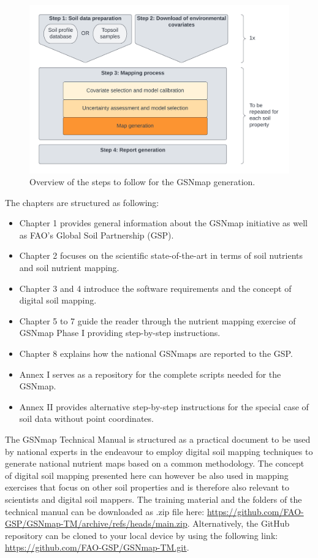 \documentclass[
  10pt,
  b5paper,
  oneside]{book}
\providecommand{\tightlist}{%
  \setlength{\itemsep}{0pt}\setlength{\parskip}{0pt}}
\begin{document}
\begin{figure}
\includegraphics[width=1\linewidth]{images/Manual-Workflow} \caption{Overview of the steps to follow for the GSNmap generation.}\label{fig:steps}
\end{figure}

The chapters are structured as following:

\begin{itemize}
\tightlist
\item
  Chapter 1 provides general information about the GSNmap initiative as well as FAO's Global Soil Partnership (GSP).
\item
  Chapter 2 focuses on the scientific state-of-the-art in terms of soil nutrients and soil nutrient mapping.
\item
  Chapter 3 and 4 introduce the software requirements and the concept of digital soil mapping.
\item
  Chapter 5 to 7 guide the reader through the nutrient mapping exercise of GSNmap Phase I providing step-by-step instructions.
\item
  Chapter 8 explains how the national GSNmaps are reported to the GSP.
\item
  Annex I serves as a repository for the complete scripts needed for the GSNmap.
\item
  Annex II provides alternative step-by-step instructions for the special case of soil data without point coordinates.
\end{itemize}

The GSNmap Technical Manual is structured as a practical document to be used by national experts in the endeavour to employ digital soil mapping techniques to generate national nutrient maps based on a common methodology. The concept of digital soil mapping presented here can however be also used in mapping exercises that focus on other soil properties and is therefore also relevant to scientists and digital soil mappers. The training material and the folders of the technical manual can be downloaded as .zip file here: \url{https://github.com/FAO-GSP/GSNmap-TM/archive/refs/heads/main.zip}. Alternatively, the GitHub repository can be cloned to your local device by using the following link: \url{https://github.com/FAO-GSP/GSNmap-TM.git}.
\end{document}
